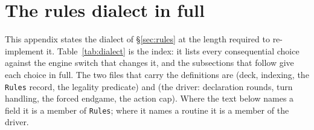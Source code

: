 \section{The rules dialect in full}
\label{app:dialect}

This appendix states the dialect of \S\ref{sec:rules} at the length required to
re-implement it. Table~\ref{tab:dialect} is the index: it lists every
consequential choice against the engine switch that changes it, and the
subsections that follow give each choice in full. The two files that carry the
definitions are  (deck, indexing, the
\texttt{Rules} record, the legality predicate) and 
(the driver: declaration rounds, turn handling, the forced endgame, the action
cap). Where the text below names a field it is a member of \texttt{Rules}; where
it names a routine it is a member of the driver.

